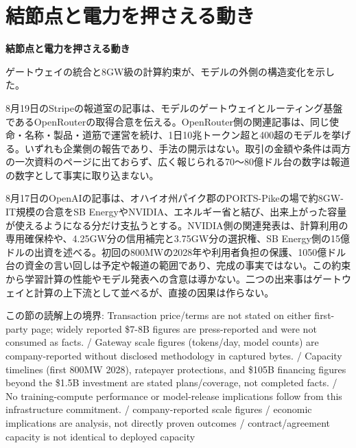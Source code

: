 \section{結節点と電力を押さえる動き}
\begin{wideflow}
{\Large\bfseries 結節点と電力を押さえる動き}\par
\smallskip
{\color{SurveyMuted}ゲートウェイの統合と8GW級の計算約束が、モデルの外側の構造変化を示した。}\par
\end{wideflow}

\noindent 8月19日のStripeの報道室の記事は、モデルのゲートウェイとルーティング基盤であるOpenRouterの取得合意を伝える。OpenRouter側の関連記事は、同じ使命・名称・製品・道筋で運営を続け、1日10兆トークン超と400超のモデルを挙げる。いずれも企業側の報告であり、手法の開示はない。取引の金額や条件は両方の一次資料のページに出ておらず、広く報じられる70〜80億ドル台の数字は報道の数字として事実に取り込まない。 \cite{w2026w34w34eventc003}\par\medskip

\noindent 8月17日のOpenAIの記事は、オハイオ州パイク郡のPORTS-Pikeの場で約8GW-IT規模の合意をSB EnergyやNVIDIA、エネルギー省と結び、出来上がった容量が使えるようになる分だけ支払うとする。NVIDIA側の関連発表は、計算利用の専用確保枠や、4.25GW分の信用補完と3.75GW分の選択権、SB Energy側の15億ドルの出資を述べる。初回の800MWの2028年や利用者負担の保護、1050億ドル台の資金の言い回しは予定や報道の範囲であり、完成の事実ではない。この約束から学習計算の性能やモデル発表への含意は導かない。二つの出来事はゲートウェイと計算の上下流として並べるが、直接の因果は作らない。 \cite{w2026w34w34eventc026}\par\medskip

\begin{claimboundary}[読解上の境界]
この節の読解上の境界: Transaction price/terms are not stated on either first-party page; widely reported \$7-8B figures are press-reported and were not consumed as facts. / Gateway scale figures (tokens/day, model counts) are company-reported without disclosed methodology in captured bytes. / Capacity timelines (first 800MW 2028), ratepayer protections, and \$105B financing figures beyond the \$1.5B investment are stated plans/coverage, not completed facts. / No training-compute performance or model-release implications follow from this infrastructure commitment. / company-reported scale figures / economic implications are analysis, not directly proven outcomes / contract/agreement capacity is not identical to deployed capacity
\end{claimboundary}
